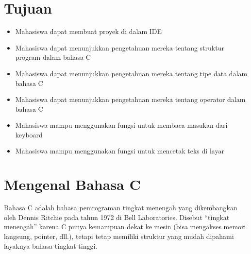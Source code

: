 \section*{Tujuan}
\begin{itemize}[label=$\bullet$, itemsep=-1pt, leftmargin=*]
	\item Mahasiswa dapat membuat proyek di dalam IDE
	\item Mahasiswa dapat menunjukkan pengetahuan mereka tentang struktur program dalam bahasa C
	\item Mahasiswa dapat menunjukkan pengetahuan mereka tentang tipe data dalam bahasa C
	\item Mahasiswa dapat menunjukkan pengetahuan mereka tentang operator dalam bahasa C
	\item Mahasiswa mampu menggunakan fungsi untuk membaca masukan dari keyboard
	\item Mahasiswa mampu menggunakan fungsi untuk mencetak teks di layar

\end{itemize}
\section*{Mengenal Bahasa C}
Bahasa C adalah bahasa pemrograman tingkat menengah yang dikembangkan oleh Dennis Ritchie pada tahun 1972 di Bell Laboratories.
Disebut “tingkat menengah” karena C punya kemampuan dekat ke mesin (bisa mengakses memori langsung, pointer, dll.),
tetapi tetap memiliki struktur yang mudah dipahami layaknya bahasa tingkat tinggi.

